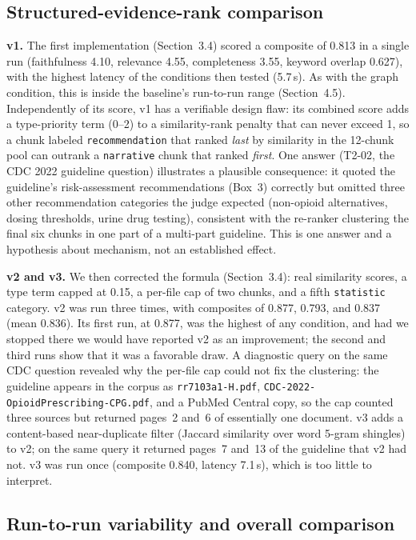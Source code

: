 \documentclass[11pt]{article}
\begin{document}
\subsection{Structured-evidence-rank comparison}

\textbf{v1.} The first implementation (Section~3.4) scored a composite of 0.813 in a single run (faithfulness 4.10, relevance 4.55, completeness 3.55, keyword overlap 0.627), with the highest latency of the conditions then tested (5.7\,s). As with the graph condition, this is inside the baseline's run-to-run range (Section~4.5). Independently of its score, v1 has a verifiable design flaw: its combined score adds a type-priority term (0--2) to a similarity-rank penalty that can never exceed 1, so a chunk labeled \texttt{recommendation} that ranked \emph{last} by similarity in the 12-chunk pool can outrank a \texttt{narrative} chunk that ranked \emph{first}. One answer (T2-02, the CDC 2022 guideline question) illustrates a plausible consequence: it quoted the guideline's risk-assessment recommendations (Box~3) correctly but omitted three other recommendation categories the judge expected (non-opioid alternatives, dosing thresholds, urine drug testing), consistent with the re-ranker clustering the final six chunks in one part of a multi-part guideline. This is one answer and a hypothesis about mechanism, not an established effect.

\textbf{v2 and v3.} We then corrected the formula (Section~3.4): real similarity scores, a type term capped at 0.15, a per-file cap of two chunks, and a fifth \texttt{statistic} category. v2 was run three times, with composites of 0.877, 0.793, and 0.837 (mean 0.836). Its first run, at 0.877, was the highest of any condition, and had we stopped there we would have reported v2 as an improvement; the second and third runs show that it was a favorable draw. A diagnostic query on the same CDC question revealed why the per-file cap could not fix the clustering: the guideline appears in the corpus as \texttt{rr7103a1-H.pdf}, \texttt{CDC-2022-OpioidPrescribing-CPG.pdf}, and a PubMed Central copy, so the cap counted three sources but returned pages~2 and~6 of essentially one document. v3 adds a content-based near-duplicate filter (Jaccard similarity over word 5-gram shingles) to v2; on the same query it returned pages~7 and~13 of the guideline that v2 had not. v3 was run once (composite 0.840, latency 7.1\,s), which is too little to interpret.

\subsection{Run-to-run variability and overall comparison}
\end{document}
